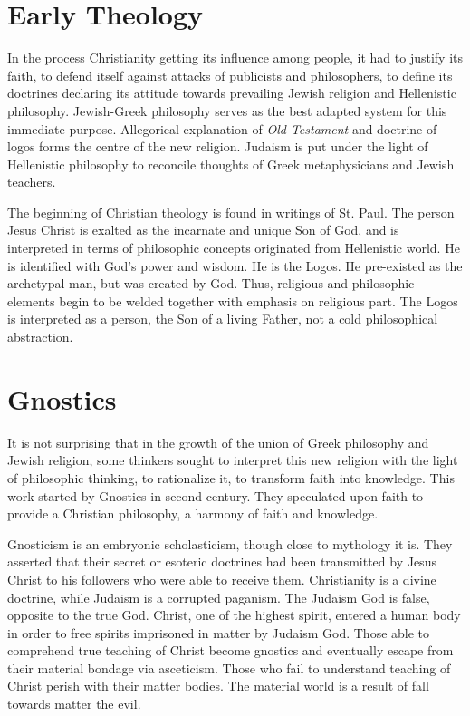 \documentclass[11pt]{article}
\begin{document}
\section{Early Theology}
In the process Christianity getting its influence among people, it had to justify its faith, to defend itself against attacks of publicists and philosophers, to define its doctrines declaring its attitude towards prevailing Jewish religion and Hellenistic philosophy. 
Jewish-Greek philosophy serves as the best adapted system for this immediate purpose. 
Allegorical explanation of \textit{Old Testament} and doctrine of logos forms the centre of the new religion. 
Judaism is put under the light of Hellenistic philosophy to reconcile thoughts of Greek metaphysicians and Jewish teachers. 

\par

The beginning of Christian theology is found in writings of St. Paul. 
The person Jesus Christ is exalted as the incarnate and unique Son of God, and is interpreted in terms of philosophic concepts originated from Hellenistic world. 
He is identified with God's power and wisdom. 
He is the Logos. 
He pre-existed as the archetypal man, but was created by God.
Thus, religious and philosophic elements begin to be welded together with emphasis on religious part. 
The Logos is interpreted as a person, the Son of a living Father, not a cold philosophical abstraction.

\section{Gnostics}
It is not surprising that in the growth of the union of Greek philosophy and Jewish religion, some thinkers sought to interpret this new religion with the light of philosophic thinking, to rationalize it, to transform faith into knowledge. 
This work started by Gnostics in second century. 
They speculated upon faith to provide a Christian philosophy, a harmony of faith and knowledge. 

\par

Gnosticism is an embryonic scholasticism, though close to mythology it is. 
They asserted that their secret or esoteric doctrines had been transmitted by Jesus Christ to his followers who were able to receive them. 
Christianity is a divine doctrine, while Judaism is a corrupted paganism. 
The Judaism God is false, opposite to the true God. 
Christ, one of the highest spirit, entered a human body in order to free spirits imprisoned in matter by Judaism God. 
Those able to comprehend true teaching of Christ become gnostics and eventually escape from their material bondage via asceticism. 
Those who fail to understand teaching of Christ perish with their matter bodies. 
The material world is a result of fall towards matter the evil. 
\end{document}
